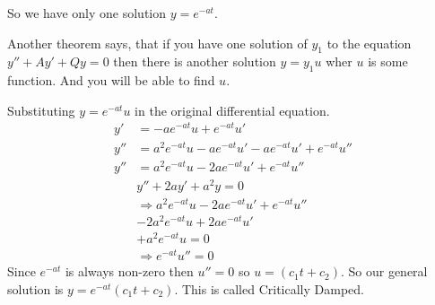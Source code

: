 So we have only one solution $y = e^{-at}$.

Another theorem says, that if you have one solution of $y_1$ to the equation $y'' + Ay' + Qy = 0$
then there is another solution $y = y_1 u$ wher $u$ is some function.
And you will be able to find $u$.

Substituting $y = e^{-at} u$ in the original differential equation.
\begin{align*}
	y' & = -ae^{-at} u + e^{-at} u' \\
	y'' & = a^2 e^{-at} u - a e^{-at} u' -a e^{-at} u' + e^{-at} u'' \\
	y'' & = a^2 e^{-at} u - 2 a e^{-at} u' + e^{-at} u'' \\
	& y'' + 2ay' + a^2y = 0 \\
	& \Rightarrow a^2 e^{-at} u - 2 a e^{-at} u' + e^{-at} u'' \\
	& - 2 a^2 e^{-at} u + 2a e^{-at} u' \\
	& + a^2 e^{-at} u = 0 \\
	& \Rightarrow e^{-at} u'' = 0
\end{align*}
Since $e^{-at}$ is always non-zero then $u'' = 0$ so $u = (c_1t + c_2)$.
So our general solution is $y = e^{-at}(c_1t + c_2)$.
This is called Critically Damped.
